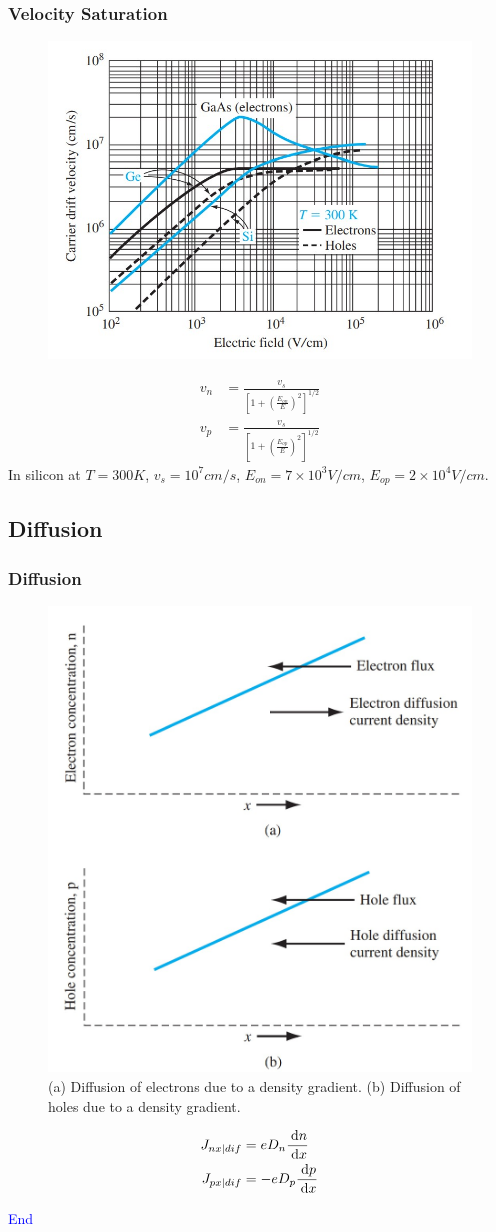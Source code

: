\documentclass{beamer}
\begin{document}
    \begin{frame} \frametitle{Velocity Saturation}
        \begin{figure}[H]
            \centering
            \includegraphics[width=0.5\linewidth]{Velocity-saturation.jpg}
            \label{fig:Velocity-saturation.jpg}
        \end{figure}
        \begin{equation*}
            \begin{aligned}
                v_n &= \frac{v_s}{\left[ 1 + \left( \frac{E_{on}}{E}  \right)^2 \right]^{1/2}} \\
                v_p &= \frac{v_s}{\left[ 1 + \left( \frac{E_{op}}{E}  \right)^2 \right]^{1/2}} 
            \end{aligned}
        \end{equation*}
        In silicon at $T = 300K$, $v_s = 10^7 cm /s$, $E_{on} = 7 \times 10^3 V /cm$, $E_{op} = 2 \times 10^4 V / cm$.
        
    \end{frame}


\subsection{Diffusion}
    \begin{frame} \frametitle{Diffusion}
        \begin{figure}[H]
            \centering
            \includegraphics[width=0.4\linewidth]{Diffusion.jpg}
            \caption{(a) Diffusion of electrons due to a density gradient. (b) Diffusion of holes due to a density gradient.}
            \label{fig:Diffusion.jpg}
        \end{figure}
        \begin{equation*}
            \begin{aligned}
                J_{nx|dif} &= eD_n \frac{\: \mathrm{d} n}{\: \mathrm{d} x} \\
                J_{px|dif} &= -e D_p \frac{\: \mathrm{d} p}{\: \mathrm{d} x} 
            \end{aligned}
        \end{equation*}
    \end{frame}

    \begin{frame} 
        \begin{center}
            \Large\textcolor{blue}{End}
        \end{center}
    \end{frame}
\end{document}
